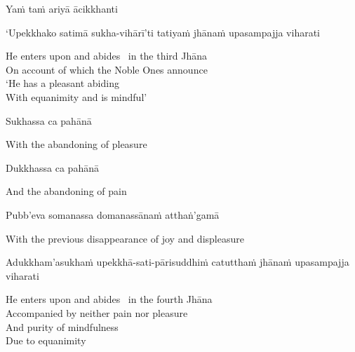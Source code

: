 Yaṁ taṁ ariyā ācikkhanti
\begin{pali-hangtogether}
  `Upekkhako satimā sukha-vihārī'ti\makeatletter\hyperlink{endnote66-appendix}\makeatother \thinspace
  tatiyaṁ jhānaṁ upasampajja viharati
\end{pali-hangtogether}

\begin{english-verses}
  He enters upon and abides \breathmark\ in the third Jhāna\\
  On account of which the Noble Ones announce\\
  `He has a pleasant abiding\\
  With equanimity and is mindful'
\end{english-verses}

Sukhassa ca pahānā

\begin{english}
  With the abandoning of pleasure
\end{english}

Dukkhassa ca pahānā

\begin{english}
  And the abandoning of pain
\end{english}

Pubb'eva somanassa domanassānaṁ atthaṅ'gamā

\begin{english}
  With the previous disappearance of joy and displeasure\makeatletter\hyperlink{endnote67-appendix}\makeatother
\end{english}

\begin{pali-hang}
  Adukkham'asukhaṁ upekkhā-sati-pārisuddhiṁ catutthaṁ jhānaṁ upasampajja viharati
\end{pali-hang}

\begin{english-verses}
  He enters upon and abides \breathmark\ in the fourth Jhāna\\
  Accompanied by neither pain nor pleasure\\
  And purity of mindfulness\\
  Due to equanimity
\end{english-verses}

